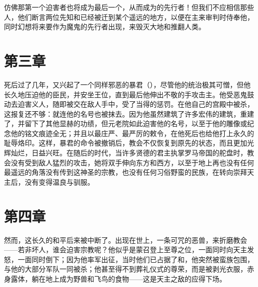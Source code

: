\par

仿佛那第一个迫害者也将成为最后一个，从而成为的先行者！但我们不应相信那些人，他们断言两位先知和已经被迁到某个遥远的地方，以便在主来审判时侍奉他，同时幻想将来要作为魔鬼的先行者出现，来毁灭大地和推翻人类。\par


\section{第三章}

死后过了几年，又兴起了一个同样邪恶的暴君（），尽管他的统治极其可憎，但他长久地压迫他的臣民，并安坐王位，直到最后他伸出不敬的手攻击主。他受恶鬼鼓动去迫害义人，随即被交在敌人手中，受了当得的惩罚。在他自己的宫殿中被杀，这报复还不够：就连他的名号也被抹去。因为他虽然建筑了许多宏伟的建筑，重建了，并留下了其他显赫的功绩，但元老院如此迫害他的名号，以至于他的雕像或纪念他的铭文痕迹全无；并且以最庄严、最严厉的敕令，在他死后也给他打上永久的耻辱烙印。这样，暴君的命令被撤销后，教会不仅恢复到原先的状态，而且更加光辉灿烂，日益兴旺。在随后的时代，当许多贤德的君主执掌罗马帝国的舵盘时，教会没有受到敌人猛烈的攻击，她将双手伸向东方和西方，以至于地上再也没有任何最遥远的角落没有传到这神圣的宗教，也没有任何习俗野蛮的民族，在转向崇拜天主后，没有变得温良与驯服。\par


\section{第四章}

然而，这长久的和平后来被中断了。出现在世上，一条可咒的恶兽，来折磨教会——若非坏人，谁会迫害宗教呢？他似乎是蒙召登上至尊之位，一面同时向天主发怒，一面同时倒下；因为他率军出征，当时他们已占据了和，他突然被蛮族包围，与他的大部分军队一同被杀；他甚至得不到葬礼仪式的尊荣，而是被剥光衣服，赤身露体，躺在地上成为野兽和飞鸟的食物——这是天主之敌的应得下场。\par


